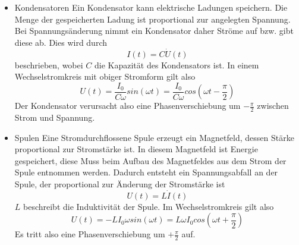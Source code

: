 \documentclass[11pt,titlepage]{article}
\begin{document}
		\begin{itemize}
			\item Kondensatoren
			\subitem Ein Kondensator kann elektrische Ladungen speichern. Die Menge der gespeicherten Ladung ist proportional zur angelegten Spannung. Bei Spannungsänderung nimmt ein Kondensator daher Ströme auf bzw. gibt diese ab. Dies wird durch
			\begin{displaymath}
				I(t) = C \dot{U} (t)
			\end{displaymath}
			beschrieben, wobei $C$ die Kapazität des Kondensators ist. In einem Wechselstromkreis mit obiger Stromform gilt also
			\begin{displaymath}
				U(t) = \frac{I_0}{C \omega}sin(\omega t) = \frac{I_0}{C \omega} cos(\omega t - \frac{\pi}{2})
			\end{displaymath}
			Der Kondensator verursacht also eine Phasenverschiebung um $-\frac{\pi}{2}$ zwischen Strom und Spannung.
			\item Spulen
			\subitem Eine Stromdurchflossene Spule erzeugt ein Magnetfeld, dessen Stärke proportional zur Stromstärke ist. In diesem Magnetfeld ist Energie gespeichert, diese Muss beim Aufbau des Magnetfeldes aus dem Strom der Spule entnommen werden. Dadurch entsteht ein Spannungsabfall an der Spule, der proportional zur Änderung der Stromstärke ist
			\begin{displaymath}
				U(t) = L \dot{I}(t)
			\end{displaymath}
			$L$ beschreibt die Induktivität der Spule. Im Wechselstromkreis gilt also
			\begin{displaymath}
				U(t) = -L I_0 \omega sin(\omega t) = L \omega I_0 cos(\omega t + \frac{\pi}{2})
			\end{displaymath}
			Es tritt also eine Phasenverschiebung um $+\frac{\pi}{2}$ auf.
		\end{itemize}
	
\end{document}
